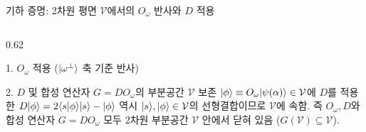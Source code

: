 \documentclass[aspectratio=169, 10pt]{beamer}
\begin{document}
\begin{frame}{기하 증명: 2차원 평면 $\mathcal{V}$에서의 $O_\omega$ 반사와 $D$ 적용}
\begin{columns}[c]
\begin{column}{0.62\textwidth}
\begin{qcblock}{1. $O_\omega$ 적용 ($|\omega^\perp\rangle$ 축 기준 반사)}
            \end{qcblock}
            \pause
            \begin{qctip}{2. $D$ 및 합성 연산자 $G = DO_\omega$의 부분공간 $\mathcal{V}$ 보존}
                {\small
                $|\phi\rangle \equiv O_\omega|\psi(\alpha)\rangle \in \mathcal{V}$에 $D$를 적용한 $D|\phi\rangle = 2\langle s|\phi\rangle|s\rangle - |\phi\rangle$ 역시 $|s\rangle, |\phi\rangle \in \mathcal{V}$의 선형결합이므로 $\mathcal{V}$에 속함. 즉 $O_\omega, D$와 합성 연산자 $G = DO_\omega$ 모두 2차원 부분공간 $\mathcal{V}$ 안에서 닫혀 있음 ($G(\mathcal{V}) \subseteq \mathcal{V}$).
                }
            \end{qctip}
        \end{column}
    \end{columns}
\end{frame}
\end{document}
